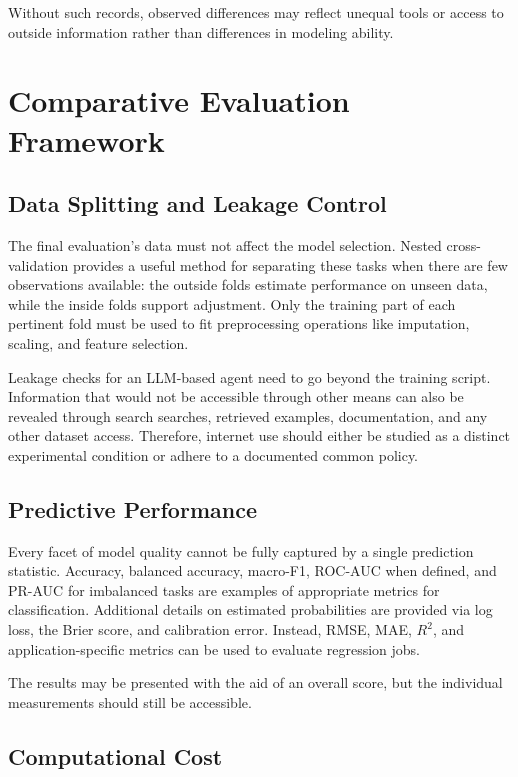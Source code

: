 \documentclass[acmsmall,screen]{acmart}
\begin{document}
Without such records, observed differences may reflect unequal tools or access to outside information rather than differences in modeling ability.

\section{Comparative Evaluation Framework}\label{sec:evaluation}

\subsection{Data Splitting and Leakage Control}

The final evaluation's data must not affect the model selection. Nested cross-validation provides a useful method for separating these tasks when there are few observations available: the outside folds estimate performance on unseen data, while the inside folds support adjustment. Only the training part of each pertinent fold must be used to fit preprocessing operations like imputation, scaling, and feature selection.

Leakage checks for an LLM-based agent need to go beyond the training script. Information that would not be accessible through other means can also be revealed through search searches, retrieved examples, documentation, and any other dataset access. Therefore, internet use should either be studied as a distinct experimental condition or adhere to a documented common policy.

\subsection{Predictive Performance}

Every facet of model quality cannot be fully captured by a single prediction statistic. Accuracy, balanced accuracy, macro-F1, ROC-AUC when defined, and PR-AUC for imbalanced tasks are examples of appropriate metrics for classification. Additional details on estimated probabilities are provided via log loss, the Brier score, and calibration error. Instead, RMSE, MAE, $R^2$, and application-specific metrics can be used to evaluate regression jobs.

The results may be presented with the aid of an overall score, but the individual measurements should still be accessible.

\subsection{Computational Cost}
\end{document}
